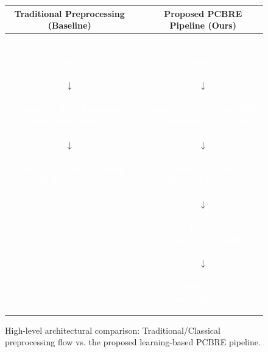 \documentclass[12pt,a4paper]{report}
\begin{document}
\begin{figure}[!ht]
  \centering
  \footnotesize
  \renewcommand{\arraystretch}{1.1}
  \vspace{-0.2cm}
  
  \begin{tabular}{ccc}
    \textbf{Traditional Preprocessing (Baseline)} & & \textbf{Proposed PCBRE Pipeline (Ours)} \\
    \midrule
    \colorbox{pcbregray}{\parbox[c][1.3cm][c]{4.0cm}{\centering\textcolor{white}{\bfseries Raw PCB\\Image}}} & &
    \colorbox{pcbregray}{\parbox[c][1.3cm][c]{4.0cm}{\centering\textcolor{white}{\bfseries Raw PCB\\Image}}} \\
    $\downarrow$ & & $\downarrow$ \\
    \colorbox{pcbreblue}{\parbox[c][1.3cm][c]{4.0cm}{\centering\textcolor{white}{\bfseries Stage 1: HSV Masking\\(Component Detection)}}} & &
    \colorbox{pcbreblue}{\parbox[c][1.3cm][c]{4.0cm}{\centering\textcolor{white}{\bfseries Stage 3: YOLOv8m-OBB\\(Component Detection)}}} \\
    $\downarrow$ & & $\downarrow$ \\
    \colorbox{pcbreblue}{\parbox[c][1.3cm][c]{4.0cm}{\centering\textcolor{white}{\bfseries Stage 2: CLAHE + Sharp\\(OCR Preprocessing)}}} & &
    \colorbox{pcbregreen}{\parbox[c][1.3cm][c]{4.0cm}{\centering\textcolor{white}{\bfseries Gemini OCR\\(OCR/Text Extraction)}}} \\
    & & $\downarrow$ \\
    & & \colorbox{pcbreblue}{\parbox[c][1.3cm][c]{4.0cm}{\centering\textcolor{white}{\bfseries Stage 4: Power Net\\Mapper (Topology)}}} \\
    & & $\downarrow$ \\
    & & \colorbox{pcbregray}{\parbox[c][1.3cm][c]{4.0cm}{\centering\textcolor{white}{\bfseries HBoM +\\Power Net Map}}} \\
    \bottomrule
  \end{tabular}
  \vspace{-0.2cm}
  \caption{High-level architectural comparison: Traditional/Classical preprocessing flow vs. the proposed learning-based PCBRE pipeline.}
  \label{fig:pipeline_overview}
\end{figure}
\end{document}
